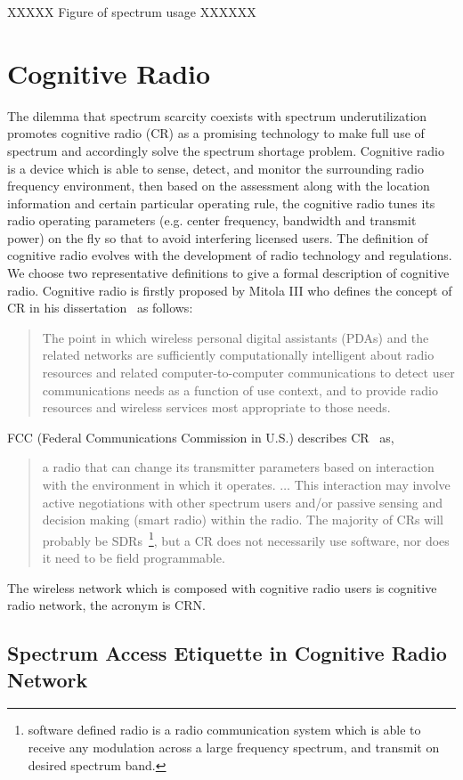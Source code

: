 XXXXX Figure of spectrum usage XXXXXX


\section{Cognitive Radio}
The dilemma that spectrum scarcity coexists with spectrum underutilization promotes cognitive radio (CR) as a promising technology to make full use of spectrum and accordingly solve the spectrum shortage problem.
Cognitive radio is a device which is able to sense, detect, and monitor the surrounding radio frequency environment, then based on the assessment along with the location information and certain particular operating rule, the cognitive radio tunes its radio operating parameters (e.g. center frequency, bandwidth and transmit power) on the fly so that to avoid interfering licensed users.
The definition of cognitive radio evolves with the development of radio technology and regulations.
We choose two representative definitions to give a formal description of cognitive radio.
Cognitive radio is firstly proposed by Mitola III who defines the concept of CR in his dissertation~\cite{2000mitola_cognitive_radio} as follows:
\blockquote{The point in which wireless personal digital assistants (PDAs) and the related networks are sufficiently computationally intelligent about radio resources and related computer-to-computer communications to detect user communications needs as a function of use context, and to provide radio resources and wireless services most appropriate to those needs.
}

FCC (Federal Communications Commission in U.S.) describes CR~\cite{FCC_03-322} as,
\blockquote{
a radio that can change its transmitter parameters based on interaction with the environment in which it operates. $\ldots$
This interaction may involve active negotiations with other spectrum users and/or passive sensing and decision making (smart radio) within the radio. The majority of CRs will probably be SDRs~\footnote{software defined radio is a radio communication system which is able to receive any modulation across a large frequency spectrum, and transmit on desired spectrum band.}, but a CR does not necessarily use software, nor does it need to be field programmable.
}

The wireless network which is composed with cognitive radio users is cognitive radio network, the acronym is CRN.

\subsection{Spectrum Access Etiquette in Cognitive Radio Network}

